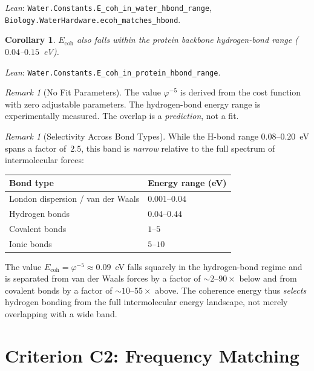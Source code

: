 \documentclass[12pt,a4paper]{article}
\newtheorem{corollary}[theorem]{Corollary}
\theoremstyle{definition}
\theoremstyle{remark}
\newtheorem{remark}[theorem]{Remark}
\begin{document}
\noindent
\textit{Lean}: \texttt{Water.Constants.E\_coh\_in\_water\_hbond\_range},
\texttt{Biology.WaterHardware.ecoh\_matches\_hbond}.

\begin{corollary}
$E_{\mathrm{coh}}$ also falls within the protein backbone hydrogen-bond
range ($0.04$--$0.15$~eV).
\end{corollary}

\noindent
\textit{Lean}: \texttt{Water.Constants.E\_coh\_in\_protein\_hbond\_range}.

\begin{remark}[No Fit Parameters]
The value $\varphi^{-5}$ is derived from the cost function with zero
adjustable parameters.  The hydrogen-bond energy range is experimentally
measured.  The overlap is a \emph{prediction}, not a fit.
\end{remark}

\begin{remark}[Selectivity Across Bond Types]
\label{rem:selectivity}
While the H-bond range $0.08$--$0.20$~eV spans a factor of~$2.5$,
this band is \emph{narrow} relative to the full spectrum of
intermolecular forces:
\begin{center}
\small
\begin{tabular}{@{}ll@{}}
\toprule
Bond type & Energy range (eV) \\
\midrule
London dispersion / van der Waals & $0.001$--$0.04$ \\
Hydrogen bonds & $0.04$--$0.44$ \\
Covalent bonds & $1$--$5$ \\
Ionic bonds & $5$--$10$ \\
\bottomrule
\end{tabular}
\end{center}
The value $E_{\mathrm{coh}} = \varphi^{-5} \approx 0.09$~eV
falls squarely in the hydrogen-bond regime and is separated from
van der Waals forces by a factor of $\sim 2$--$90\times$ below and
from covalent bonds by a factor of $\sim 10$--$55\times$ above.
The coherence energy thus \emph{selects} hydrogen bonding from the
full intermolecular energy landscape, not merely overlapping with a
wide band.
\end{remark}

\section{Criterion C2: Frequency Matching}
\label{sec:frequency}
\end{document}
